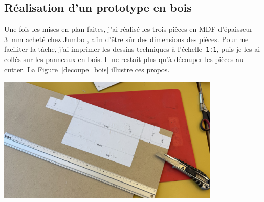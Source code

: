 \begin{minipage}{\textwidth}
    \subsection{Réalisation d'un prototype en bois} \label{prototype_bois}
    Une fois les mises en plan faites, j'ai réalisé les trois pièces en MDF d'épaisseur 3~mm acheté chez Jumbo \cite{mdfJumbo}, afin d'être sûr des dimensions des pièces. Pour me faciliter la tâche, j'ai imprimer les dessins techniques à l'échelle~\texttt{1:1}, puis je les ai collés sur les panneaux en bois. Il ne restait plus qu'à découper les pièces au cutter. La Figure~\ref{decoupe_bois} illustre ces propos.
    \vspace{1em}
    \begin{center}
        \includegraphics[width=0.8\textwidth]{assets/figures/Protections_laser/Securite_mecanique/Protection_entree_laser/decoupe_bois.jpeg}
    \end{center}
    \label{decoupe_bois}
\end{minipage}

